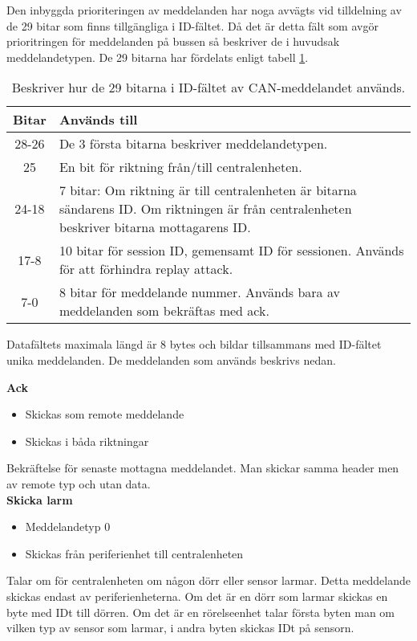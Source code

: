 Den inbyggda prioriteringen av meddelanden har noga avvägts vid tilldelning av de 29 bitar som finns tillgängliga i ID-fältet.
Då det är detta fält som avgör prioritringen för meddelanden på bussen så beskriver de i huvudsak meddelandetypen.
De 29 bitarna har fördelats enligt tabell \ref{tab:idbitar}.

\begin{table}[H]
	\centering
	\begin{tabular}{|c|p{}|}
		\hline
		Bitar 	& Används till \\ \hline \hline
		28-26		& De 3 första bitarna beskriver meddelandetypen. \\ \hline
		25		& En bit för riktning från/till centralenheten. \\ \hline
		24-18	& 7 bitar:
		Om riktning är till centralenheten är bitarna sändarens ID.
		Om riktningen är från centralenheten beskriver bitarna mottagarens ID. \\ \hline
		17-8 & 10 bitar för session ID, gemensamt ID för sessionen. Används för att förhindra replay attack. \\ \hline
		7-0 & 8 bitar för meddelande nummer. Används bara av meddelanden som bekräftas med ack. \\ \hline

	\end{tabular}
	\caption{Beskriver hur de 29 bitarna i ID-fältet av CAN-meddelandet används.}
	\label{tab:idbitar}
\end{table}


Datafältets maximala längd är 8 bytes och bildar tillsammans med ID-fältet unika meddelanden. De meddelanden som används beskrivs nedan.



\textbf{Ack}
\begin{itemize}
    \item Skickas som remote meddelande
    \item Skickas i båda riktningar
\end{itemize}
Bekräftelse för senaste mottagna meddelandet. Man skickar samma header men av remote typ och utan data. \\


\textbf{Skicka larm}
\begin{itemize}
    \item Meddelandetyp 0
    \item Skickas från periferienhet till centralenheten
\end{itemize}
Talar om för centralenheten om någon dörr eller sensor larmar. Detta meddelande skickas endast av periferienheterna. Om det är en dörr som larmar skickas en byte med IDt till dörren. Om det är en rörelseenhet talar första byten man om vilken typ av sensor som larmar, i andra byten skickas IDt på sensorn.\\


